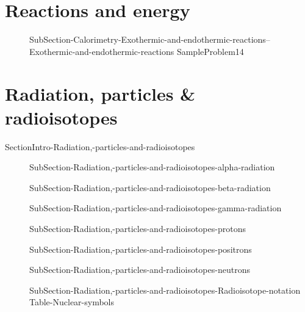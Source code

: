 \documentclass[main.tex]{subfiles}
\begin{document}
 \section{\faFire Reactions and energy}
\sloppy \begin{description}
\item[]  {SubSection-Calorimetry-Exothermic-and-endothermic-reactions--Exothermic-and-endothermic-reactions}
  {SampleProblem14}
  \end{description}

\section{\faFlash Radiation, particles \& radioisotopes}
{SectionIntro-Radiation,-particles-and-radioisotopes}
\sloppy \begin{description}
\item[] 
{SubSection-Radiation,-particles-and-radioisotopes-alpha-radiation}
\item[] 
  {SubSection-Radiation,-particles-and-radioisotopes-beta-radiation}
\item[] 
{SubSection-Radiation,-particles-and-radioisotopes-gamma-radiation}
\item[] 
{SubSection-Radiation,-particles-and-radioisotopes-protons}
\item[] 
 {SubSection-Radiation,-particles-and-radioisotopes-positrons}
\item[] 
{SubSection-Radiation,-particles-and-radioisotopes-neutrons}
\item[] 
 {SubSection-Radiation,-particles-and-radioisotopes-Radioisotope-notation}
  {Table-Nuclear-symbols}
\end{description}
\end{document}
